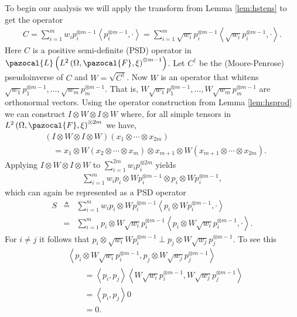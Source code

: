 \documentclass[aos,preprint]{imsart}
\def\l{\left}
\def\r{\right}
\def\sF{\pazocal{F}}
\def\sL{\pazocal{L}}
\theoremstyle{plain}
\theoremstyle{defintion}
\begin{document}
To begin our analysis we will apply the transform from Lemma \ref{lem:hstens} to get the operator
\begin{eqnarray*}
	C = \sum_{i=1}^m w_i p_i^{\otimes m-1} \l<p_i^{\otimes m-1} ,\cdot\r> = \sum_{i=1}^m \sqrt{w_i} p_i^{\otimes m-1} \l<\sqrt{w_i}p_i^{\otimes m-1} ,\cdot\r>.
\end{eqnarray*}
\sloppy Here $C$ is a positive semi-definite (PSD) operator in  $\sL \l(L^2\left( \Omega,\sF,\xi \right)^{\otimes m-1}\r)$. Let $C^\dagger$ be the (Moore-Penrose) pseudoinverse of $C$ and $W = \sqrt{C^\dagger}$. Now $W$ is an operator that whitens $\sqrt{w_1} p_1^{\otimes m-1},\ldots, \sqrt{w_m}p_m^{\otimes m-1}$. That is, $W \sqrt{w_1} p_1^{\otimes m-1},\ldots,W \sqrt{w_m}p_m^{\otimes m-1}$ are orthonormal vectors. Using the operator construction from Lemma \ref{lem:hsprod} we can construct $I\otimes W\otimes I \otimes W$ where, for all simple tensors in $L^2\left( \Omega,\sF,\xi \right)^{\otimes 2m}$ we have,
\begin{align*}
	&(I\otimes W \otimes I \otimes W) \left( x_1\otimes \cdots \otimes x_{2m} \right) \\
	&\quad = x_1 \otimes W\left( x_2 \otimes \cdots \otimes x_m \right) \otimes x_{m+1} \otimes W\left(x_{m+1} \otimes \cdots \otimes x_{2m}  \right).
\end{align*}
Applying $I\otimes W \otimes I \otimes W$ to $\sum_{i=1}^{2m} w_i p_i^{\otimes 2m}$ yields
\begin{eqnarray*}
	\sum_{i=1}^m w_i p_i\otimes W p_i^{\otimes m-1} \otimes p_i\otimes W p_i^{\otimes m-1},
\end{eqnarray*}
which can again be represented as a PSD operator
\begin{eqnarray*}
	S &\triangleq& \sum_{i=1}^m w_i p_i\otimes W p_i^{\otimes m-1} \l< p_i\otimes W p_i^{\otimes m-1},\cdot\r> \\
		 &=& \sum_{i=1}^m  p_i\otimes W \sqrt{w_i}p_i^{\otimes m-1} \l< p_i\otimes W \sqrt{w_i} p_i^{\otimes m-1},\cdot\r>.
\end{eqnarray*}
For $i\neq j$ it follows that $ p_i\otimes\sqrt{w_i} W p_i^{\otimes m-1} \perp  p_j\otimes W\sqrt{w_j} p_j^{\otimes m-1}$. To see this 
\begin{align*}
	&\l< p_i\otimes W \sqrt{w_i} p_i^{\otimes m-1} ,  p_j\otimes W \sqrt{w_j}p_j^{\otimes m-1}\r>\\
	&\qquad =\l<p_i,p_j\r> \l<  W \sqrt{w_i} p_i^{\otimes m-1} ,W\sqrt{w_j} p_j^{\otimes m-1}\r>\\
	       &\qquad =\l<p_i,p_j\r> 0 \\
		      &\qquad = 0.
\end{align*}
\end{document}
